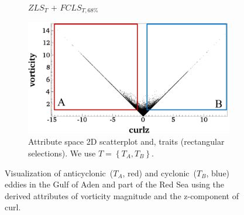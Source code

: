 \begin{figure}[!h]
\begin{subfigure}{0.24\linewidth}
\vspace{-2mm}
\caption{$ZLS_{T}$ + $FCLS_{T,68\%}$}
\label{fig:rse_fcls}
\end{subfigure}
\hfill
\begin{subfigure}{0.24\linewidth}
\centering
\includegraphics[width=0.95\linewidth]{Images/RedSeaEddy/scatterplot.pdf}
\vspace{-2mm}
\caption{Attribute space 2D scatterplot and, traits (rectangular selections). We use $T = \left\{T_{A}, T_{B}\right\}$.} 
\label{fig:rse_scatterplot}
\end{subfigure}
\vspace{-2mm}
\caption{Visualization of anticyclonic~($T_{A}$, red) and cyclonic~($T_{B}$, blue) eddies in the Gulf of Aden and part of the Red Sea using the derived attributes of vorticity magnitude and the z-component of curl.}
\label{fig:rse}
\end{figure}
